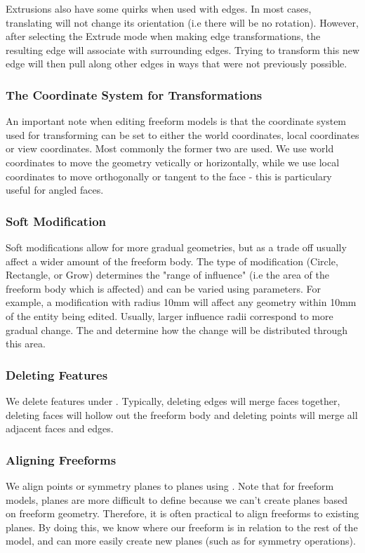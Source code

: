 Extrusions also have some quirks when used with edges. In most cases, translating will not change its orientation (i.e there will be no rotation). However, after selecting the Extrude mode when making edge transformations, the resulting edge will associate with surrounding edges. Trying to transform this new edge will then pull along other edges in ways that were not previously possible. 


\subsubsection{The Coordinate System for Transformations}
\mediumdifficulty
An important note when editing freeform models is that the coordinate system used for transforming can be set to either the world coordinates, local coordinates or view coordinates. Most commonly the former two are used. We use world coordinates to move the geometry vetically or horizontally, while we use local coordinates to move orthogonally or tangent to the face - this is particulary useful for angled faces.

\subsubsection{Soft Modification}
Soft modifications allow for more gradual geometries, but as a trade off usually affect a wider amount of the freeform body. The type of modification (Circle, Rectangle, or Grow) determines the "range of influence" (i.e the area of the freeform body which is affected) and can be varied using parameters. For example, a  modification with radius 10mm will affect any geometry within 10mm of the entity being edited. Usually, larger influence radii correspond to more gradual change. The  and  determine how the change will be distributed through this area.

\subsubsection{Deleting Features}
\easydifficulty
We delete features under . Typically, deleting edges will merge faces together, deleting faces will hollow out the freeform body and deleting points will merge all adjacent faces and edges.

\subsubsection{Aligning Freeforms}
We align points or symmetry planes to planes using . Note that for freeform models, planes are more difficult to define because we can't create planes based on freeform geometry. Therefore, it is often practical to align freeforms to existing planes. By doing this, we know where our freeform is in relation to the rest of the model, and can more easily create new planes (such as for symmetry operations).

